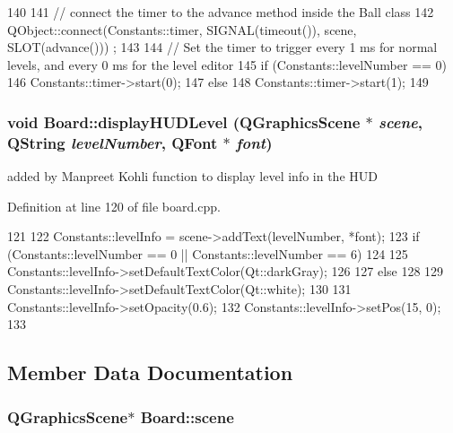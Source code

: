 \begin{DoxyCode}
140 {
141     // connect the timer to the advance method inside the Ball class
142     QObject::connect(Constants::timer, SIGNAL(timeout()), scene, SLOT(advance()))
      ;
143 
144     // Set the timer to trigger every 1 ms for normal levels, and every  0 ms for
       the level editor
145     if (Constants::levelNumber == 0)
146         Constants::timer->start(0);
147     else
148         Constants::timer->start(1);
149 }
\end{DoxyCode}
\hypertarget{class_board_a2286843a8e0eba6fba44d81f4e82b635}{
\subsubsection[{displayHUDLevel}]{\setlength{\rightskip}{0pt plus 5cm}void Board::displayHUDLevel (QGraphicsScene $\ast$ {\em scene}, \/  QString {\em levelNumber}, \/  QFont $\ast$ {\em font})}}
\label{class_board_a2286843a8e0eba6fba44d81f4e82b635}
added by Manpreet Kohli function to display level info in the HUD 

Definition at line 120 of file board.cpp.


\begin{DoxyCode}
121 {
122     Constants::levelInfo = scene->addText(levelNumber, *font);
123     if (Constants::levelNumber == 0 || Constants::levelNumber == 6)
124     {
125         Constants::levelInfo->setDefaultTextColor(Qt::darkGray);
126     }
127     else
128     {
129         Constants::levelInfo->setDefaultTextColor(Qt::white);
130     }
131     Constants::levelInfo->setOpacity(0.6);
132     Constants::levelInfo->setPos(15, 0);
133 }
\end{DoxyCode}


\subsection{Member Data Documentation}
\hypertarget{class_board_a4e915266f037507fed868719ba3a8ecf}{
\subsubsection[{scene}]{\setlength{\rightskip}{0pt plus 5cm}QGraphicsScene$\ast$ {\bf Board::scene}}}
\label{class_board_a4e915266f037507fed868719ba3a8ecf}


